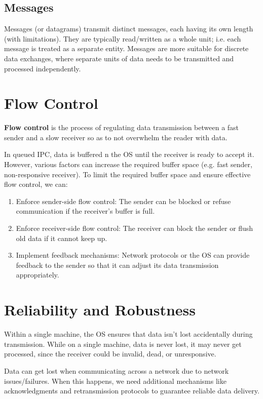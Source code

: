 \documentclass{report}
\newcommand{\definitionBegin}[1]{\begin{tcolorbox}[title={Definition: #1}]}
\newcommand{\definitionEnd}{\end{tcolorbox}}
\begin{document}
\subsection{Messages}
Messages (or datagrams) transmit distinct messages, each having its own length (with
limitations). They are typically read/written as a whole unit; i.e. each message is treated as a
separate entity. Messages are more suitable for discrete data exchanges, where separate units of
data needs to be transmitted and processed independently.





\section{Flow Control}
\definitionBegin{Flow Control}
\textbf{Flow control} is the process of regulating data transmission between a fast sender and a
slow receiver so as to not overwhelm the reader with data.
\definitionEnd

In queued IPC, data is buffered n the OS until the receiver is ready to accept it. However, various
factors can increase the required buffer space (e.g. fast sender, non-responsive receiver). To limit
the required buffer space and ensure effective flow control, we can:
\begin{enumerate}[label=\textit{(\roman*)}]
\item Enforce sender-side flow control: The sender can be blocked or refuse communication if the
  receiver's buffer is full.
\item Enforce receiver-side flow control: The receiver can block the sender or flush old data if it
  cannot keep up.
\item Implement feedback mechanisms: Network protocols or the OS can provide feedback to the sender
  so that it can adjust its data transmission appropriately.
\end{enumerate}





\section{Reliability and Robustness}
Within a single machine, the OS ensures that data isn't lost accidentally during
transmission. While on a single machine, data is never lost, it may never get processed, since the
receiver could be invalid, dead, or unresponsive.

Data can get lost when communicating across a network due to network issues/failures. When this
happens, we need additional mechanisms like acknowledgments and retransmission protocols to
guarantee reliable data delivery.
\end{document}
